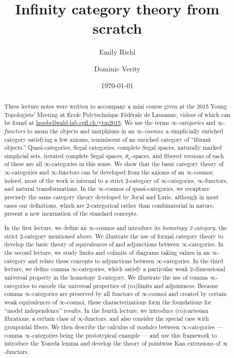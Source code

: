 \documentclass[12pt,reqno]{amsart}
\title{Infinity category theory from scratch}
\author[Riehl]{Emily Riehl}
\author[Verity]{Dominic Verity}
\date{\today}
\theoremstyle{plain}
\theoremstyle{definition}
\theoremstyle{remark}
\numberwithin{equation}{subsection}
\begin{document}
  
  \ifpdf
  \else
  \fi
  
\begin{abstract} 
These lecture notes were written to accompany a mini course given at the 2015 Young Topologists' Meeting at \'{E}cole Polytechnique F\'{e}d\'{e}rale de Lausanne, videos of which can be found at  \href{http://hessbellwald-lab.epfl.ch/ytm2015}{hessbellwald-lab.epfl.ch/ytm2015}. We use the terms $\infty$-\emph{categories} and $\infty$-\emph{functors} to mean the objects and morphisms in an $\infty$-\emph{cosmos}: a simplicially enriched category satisfying a few axioms, reminiscent of an enriched category of ``fibrant objects.'' Quasi-categories, Segal categories, complete Segal spaces, naturally marked simplicial sets, iterated complete Segal spaces, $\theta_n$-spaces, and fibered versions of each of these are all $\infty$-categories in this sense. We show that the basic category theory of $\infty$-categories and $\infty$-functors can be developed from the axioms of an $\infty$-cosmos; indeed, most of the work is internal to a strict 2-category of $\infty$-categories, $\infty$-functors, and natural transformations. In the $\infty$-cosmos of quasi-categories, we recapture precisely the same category theory developed by Joyal and Lurie, although in most cases our definitions, which are 2-categorical rather than combinatorial in nature, present a new incarnation of the standard concepts.

In the first lecture, we define an $\infty$-cosmos and introduce its \emph{homotopy 2-category}, the strict 2-category mentioned above. We illustrate the use of formal category theory to develop the basic theory of equivalences of and adjunctions between $\infty$-categories. In the second lecture, we study limits and colimits of diagrams taking values in an $\infty$-category and relate these concepts to adjunctions between $\infty$-categories. In the third lecture, we define comma $\infty$-categories, which satisfy a particular weak 2-dimensional universal property in the homotopy 2-category. We illustrate the use of comma $\infty$-categories to encode the universal properties of (co)limits and adjointness. Because comma $\infty$-categories are preserved by all functors of $\infty$-cosmoi and created by certain weak equivalences of $\infty$-cosmoi, these characterizations form the foundations for ``model independence'' results. In the fourth lecture, we introduce (co)cartesian fibrations, a certain class of $\infty$-functors, and also consider the special case with groupoidal fibers. We then describe the calculus of \emph{modules} between $\infty$-categories ---  comma $\infty$-categories being the prototypical example --- and use this framework to introduce the Yoneda lemma and develop the theory of pointwise Kan extensions of $\infty$-functors.
\end{abstract}
  
\end{document}
